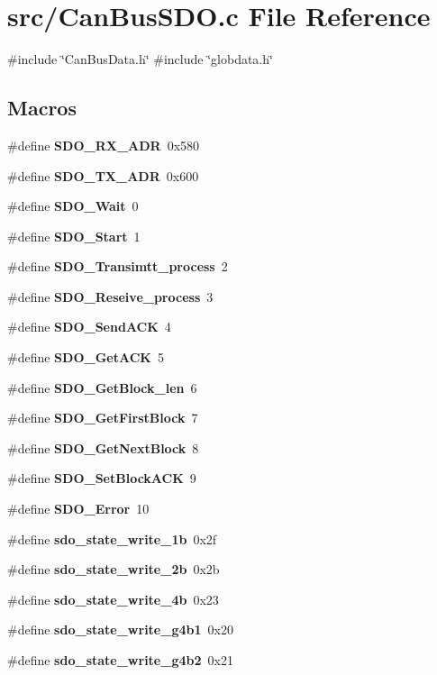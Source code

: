 \section{src/\+Can\+Bus\+S\+DO.c File Reference}
\label{_can_bus_s_d_o_8c}
{\ttfamily \#include \char`\"{}Can\+Bus\+Data.\+h\char`\"{}}\newline
{\ttfamily \#include \char`\"{}globdata.\+h\char`\"{}}\newline
\subsection*{Macros}
\begin{DoxyCompactItemize}
\item 
\#define \textbf{ S\+D\+O\+\_\+\+R\+X\+\_\+\+A\+DR}~0x580
\item 
\#define \textbf{ S\+D\+O\+\_\+\+T\+X\+\_\+\+A\+DR}~0x600
\item 
\#define \textbf{ S\+D\+O\+\_\+\+Wait}~0
\item 
\#define \textbf{ S\+D\+O\+\_\+\+Start}~1
\item 
\#define \textbf{ S\+D\+O\+\_\+\+Transimtt\+\_\+process}~2
\item 
\#define \textbf{ S\+D\+O\+\_\+\+Reseive\+\_\+process}~3
\item 
\#define \textbf{ S\+D\+O\+\_\+\+Send\+A\+CK}~4
\item 
\#define \textbf{ S\+D\+O\+\_\+\+Get\+A\+CK}~5
\item 
\#define \textbf{ S\+D\+O\+\_\+\+Get\+Block\+\_\+len}~6
\item 
\#define \textbf{ S\+D\+O\+\_\+\+Get\+First\+Block}~7
\item 
\#define \textbf{ S\+D\+O\+\_\+\+Get\+Next\+Block}~8
\item 
\#define \textbf{ S\+D\+O\+\_\+\+Set\+Block\+A\+CK}~9
\item 
\#define \textbf{ S\+D\+O\+\_\+\+Error}~10
\item 
\#define \textbf{ sdo\+\_\+state\+\_\+write\+\_\+1b}~0x2f
\item 
\#define \textbf{ sdo\+\_\+state\+\_\+write\+\_\+2b}~0x2b
\item 
\#define \textbf{ sdo\+\_\+state\+\_\+write\+\_\+4b}~0x23
\item 
\#define \textbf{ sdo\+\_\+state\+\_\+write\+\_\+g4b1}~0x20
\item 
\#define \textbf{ sdo\+\_\+state\+\_\+write\+\_\+g4b2}~0x21
\item 

\end{DoxyCompactItemize}
